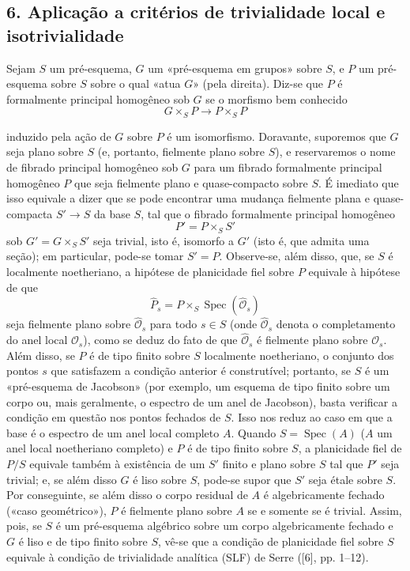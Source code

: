 \subsection*{6. Aplicação a critérios de trivialidade local e isotrivialidade}

Sejam $S$ um pré-esquema, $G$ um «pré-esquema em grupos» sobre $S$, e $P$ um
pré-esquema sobre $S$ sobre o qual «atua $G$» (pela direita). Diz-se que $P$
é formalmente principal homogêneo sob $G$ se o morfismo bem conhecido
\[
  G\times_SP\longrightarrow P\times_SP
\]

induzido pela ação de $G$ sobre $P$ é um isomorfismo. Doravante, suporemos que
$G$ seja plano sobre $S$ (e, portanto, fielmente plano sobre $S$), e reservaremos
o nome de fibrado principal homogêneo sob $G$ para um fibrado formalmente
principal homogêneo $P$ que seja fielmente plano e quase-compacto sobre $S$.
É imediato que isso equivale a dizer que se pode encontrar uma mudança
fielmente plana e quase-compacta
$S'\longrightarrow S$ da base $S$, tal que o fibrado formalmente principal
homogêneo
\[
  P'=P\times_SS'
\]
sob $G'=G\times_SS'$ seja trivial, isto é, isomorfo a $G'$ (isto é, que
admita uma seção); em particular, pode-se tomar $S'=P$. Observe-se, além disso,
que, se $S$ é localmente noetheriano, a hipótese de planicidade fiel sobre $P$
equivale à hipótese de que
\[
  \widehat P_s=P\times_S\operatorname{Spec}(\widehat{\mathcal O}_s)
\]
seja fielmente plano sobre $\widehat{\mathcal O}_s$ para todo $s\in S$ (onde
$\widehat{\mathcal O}_s$ denota o completamento do anel local
$\mathcal O_s$), como se deduz do fato de que $\widehat{\mathcal O}_s$ é
fielmente plano sobre $\mathcal O_s$. Além disso, se $P$ é de tipo finito sobre
$S$ localmente noetheriano, o conjunto dos pontos $s$ que satisfazem a
condição anterior é construtível; portanto, se $S$ é um «pré-esquema de
Jacobson» (por exemplo, um esquema de tipo finito sobre um corpo ou, mais
geralmente, o espectro de um anel de Jacobson), basta verificar a
condição em questão nos pontos fechados de $S$. Isso nos reduz ao caso em
que a base é o espectro de um anel local completo $A$. Quando
$S=\operatorname{Spec}(A)$ ($A$ um anel local noetheriano completo) e $P$ é
de tipo finito sobre $S$, a planicidade fiel de $P/S$ equivale também à
existência de um $S'$ finito e plano sobre $S$ tal que $P'$ seja trivial; e, se
além disso $G$ é liso sobre $S$, pode-se supor que $S'$ seja étale sobre $S$.
Por conseguinte, se além disso o corpo residual de $A$ é algebricamente fechado
(«caso geométrico»), $P$ é fielmente plano sobre $A$ se e somente se é trivial.
Assim, pois, se $S$ é um pré-esquema algébrico sobre um corpo algebricamente
fechado e $G$ é liso e de tipo finito sobre $S$, vê-se que a condição de
planicidade fiel sobre $S$ equivale à condição de trivialidade analítica (SLF)
de Serre ([6], pp. 1--12).

